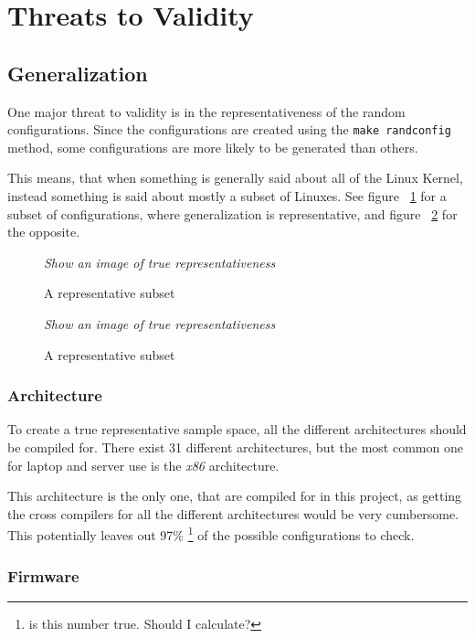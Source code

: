 \documentclass[a4paper,11pt]{article}
\newcommand{\textcode}[1]{
    \fboxsep=1pt
    \texttt{\colorbox{gray!20}{#1}}
}
\newcommand{\figa}{
    \begin{figure}[!htpb]
    \centering
}
\newcommand{\figb}[2]{
    \caption{#1}
    \label{#2}
    \end{figure}
}
\begin{document}
\newpage
\section{Threats to Validity}



\subsection{Generalization}

One major threat to validity is in the representativeness of the random 
configurations. Since the configurations are created using the \textcode{make 
randconfig} method, some configurations are more likely to be generated than 
others.

This means, that when something is generally said about all of the Linux 
Kernel, instead something is said about mostly a subset of Linuxes. See figure 
~\ref{fig:repsubset} for a subset of configurations, where generalization is 
representative, and figure ~\ref{fig:unrepsubset} for the opposite.

\figa
    \emph{Show an image of true representativeness}
\figb{A representative subset}{fig:repsubset}

\figa
    \emph{Show an image of true representativeness}
\figb{A representative subset}{fig:unrepsubset}

\subsubsection{Architecture}

To create a true representative sample space, all the different architectures 
should be compiled for. There exist 31 different architectures, but the most 
common one for laptop and server use is the \emph{x86} architecture.

This architecture is the only one, that are compiled for in this project, as 
getting the cross compilers for all the different architectures would be very 
cumbersome. 
\\


This potentially leaves out 97\% \footnote{is this number true. Should I 
calculate?} of the possible configurations to check.

\subsubsection{Firmware}
\end{document}
